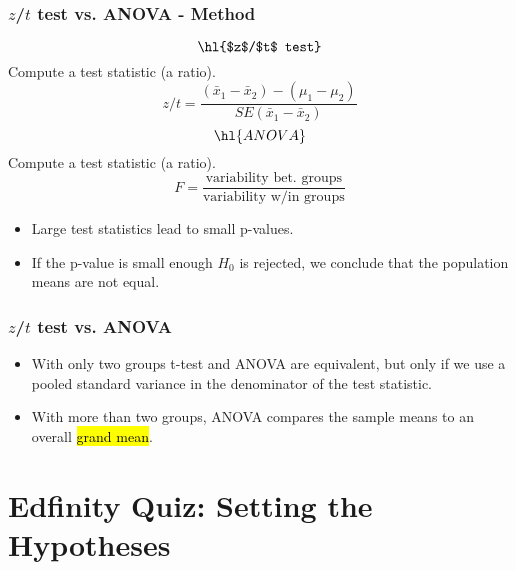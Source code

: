 \documentclass[slidestop,compress,mathserif]{beamer}
\begin{document}

\begin{frame}
\frametitle{$z$/$t$ test vs. ANOVA - Method}

{
\[ \hl{$z$/$t$ test} \]
Compute a test statistic (a ratio).
\[ z / t = \frac{(\bar{x}_1 - \bar{x}_2) - (\mu_1 - \mu_2)}{SE(\bar{x}_1 - \bar{x}_2)} \]
}
{
\[ \hl{ANOVA} \]
Compute a test statistic (a ratio).
\[ F = \frac{\text{variability bet. groups}}{\text{variability w/in groups}} \]
}

\vspace{1cm}

\pause

\begin{itemize}

\item Large test statistics lead to small p-values. 

\item If the p-value is small enough $H_0$ is rejected, we conclude that the population means are not equal.

\end{itemize}

\end{frame}


\begin{frame}
\frametitle{$z$/$t$ test vs. ANOVA}

\begin{itemize}

\item With only two groups t-test and ANOVA are equivalent, but only if we use a pooled standard variance in the denominator of the test statistic.

\pause

\item With more than two groups, ANOVA compares the sample means to an overall \hl{grand mean}.

\end{itemize}

\end{frame}


\section{Edfinity Quiz: Setting the Hypotheses}

\end{document}
